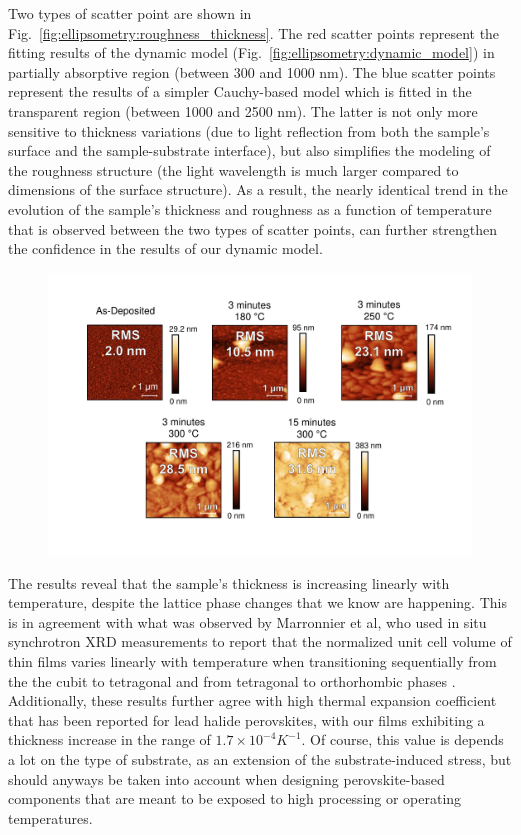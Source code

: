 Two types of scatter point are shown in Fig.~\ref{fig:ellipsometry:roughness_thickness}. The red scatter points represent the fitting results of the dynamic model (Fig.~\ref{fig:ellipsometry:dynamic_model}) in partially absorptive region (between 300 and 1000 nm). The blue scatter points represent the results of a simpler Cauchy-based model which is fitted in the transparent region (between 1000 and 2500 nm). The latter is not only more sensitive to thickness variations (due to light reflection from both the sample's surface and the sample-substrate interface),
but also simplifies the modeling of the roughness structure (the light wavelength is much larger compared to dimensions of the surface structure). As a result, the nearly identical trend in the evolution of the sample's thickness and roughness as a function of temperature that is observed between the two types of scatter points, can further strengthen the confidence in the results of our dynamic model. 


\begin{figure}[htbp]
  \centering
  \medskip
  \includegraphics[width=1\textwidth]{chapters/ellipsometry/image/afm_all.pdf}
  \caption{}
  \label{fig:ellipsometry:afm_all}
\end{figure}


The results reveal that the sample's thickness is increasing linearly with temperature, despite the lattice phase changes that we know are happening. This is in agreement with what was observed by Marronnier et al, who used in situ synchrotron XRD measurements to report that the normalized unit cell volume of  thin films varies linearly with temperature when transitioning sequentially from the the cubit to tetragonal and from tetragonal to orthorhombic phases \cite{Marronnier2018AnharmonicityCells}. Additionally, these results further agree with high thermal expansion coefficient that has been reported for lead halide perovskites, with our films exhibiting a thickness increase in the range of $1.7\times10^{-4}K^{-1}$. Of course, this value is depends a lot on the type of substrate, as an extension of the substrate-induced stress, but should anyways be taken into account when designing perovskite-based components that are meant to be exposed to high processing or operating temperatures. 

